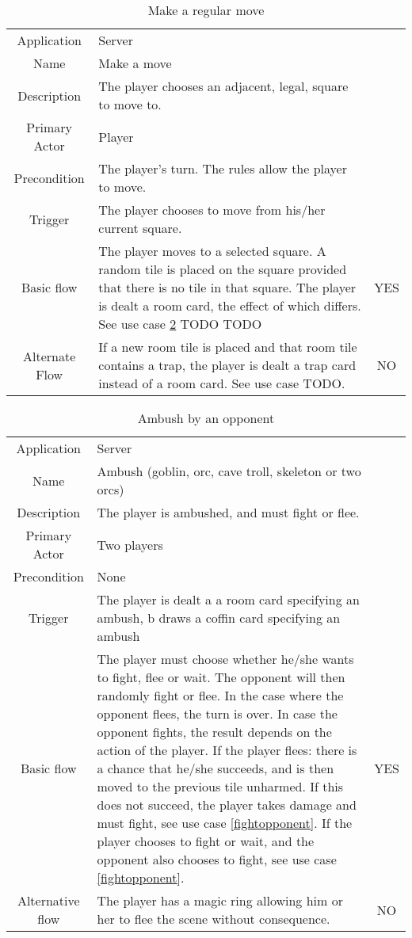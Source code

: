 \documentclass[a4paper,10pt]{report}
\begin{document}
\begin{table}
\caption{Make a regular move}
\label{move}
\begin{tabular}{|c| p{9cm}|c}
\hline
Application & Server & \\
Name & Make a move & \\
Description & The player chooses an adjacent, legal, square to move to. & \\
Primary Actor & Player & \\
Precondition & The player's turn. The rules allow the player to move. & \\
Trigger & The player chooses to move from his/her current square. & \\ \hline
Basic flow & The player moves to a selected square. A random tile is placed on the square provided that there is no tile in that square. The player is dealt a room card, the effect of which differs. See use case \ref{ambushopponent} TODO TODO & YES \\ \hline
Alternate Flow & If a new room tile is placed and that room tile contains a trap, the player is dealt a trap card instead of a room card. See use case TODO.  & NO \\\hline
\hline
\end{tabular}
\end{table}


\begin{table}
\caption{Ambush by an opponent}
\label{ambushopponent}
\begin{tabular}{|c| p{9cm}|c}
\hline
Application & Server & \\
Name & Ambush (goblin, orc, cave troll, skeleton or two orcs) & \\
Description & The player is ambushed, and must fight or flee. & \\
Primary Actor & Two players & \\
Precondition & None & \\
Trigger & The player is dealt a a room card specifying an ambush, b draws a coffin card specifying an ambush & \\ \hline
Basic flow & The player must choose whether he/she wants to fight, flee or wait. The opponent will then randomly fight or flee. In the case where the opponent flees, the turn is over. In case the opponent fights, the result depends on the action of the player. If the player flees: there is a chance that he/she succeeds, and is then moved to the previous tile unharmed. If this does not succeed, the player takes damage and must fight, see use case \ref{fightopponent}. If the player chooses to fight or wait, and the opponent also chooses to fight, see use case \ref{fightopponent}. & YES \\ \hline
Alternative flow & The player has a magic ring allowing him or her to flee the scene without consequence. & NO\\
\hline
\end{tabular}
\end{table}
\end{document}
